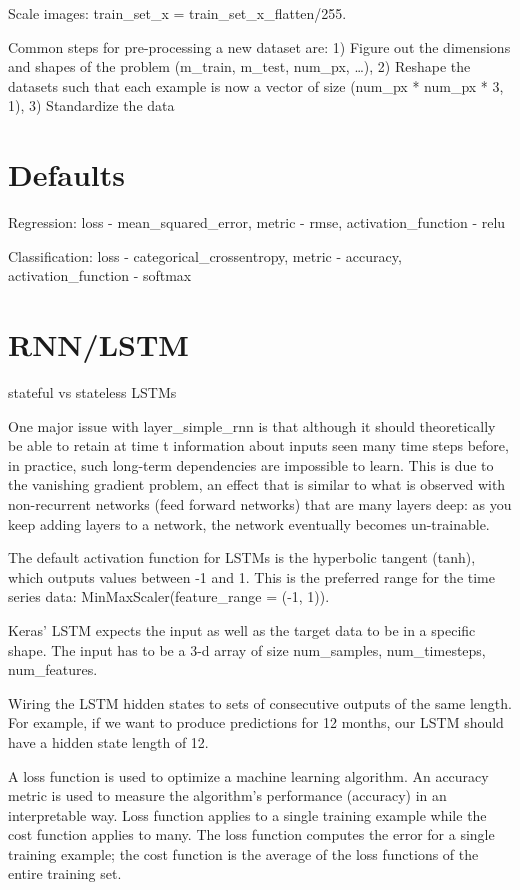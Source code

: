 \documentclass[]{book}
\begin{document}
Scale images: train\_set\_x = train\_set\_x\_flatten/255.

Common steps for pre-processing a new dataset are: 1) Figure out the
dimensions and shapes of the problem (m\_train, m\_test, num\_px,
\ldots{}), 2) Reshape the datasets such that each example is now a
vector of size (num\_px * num\_px * 3, 1), 3) Standardize the data

\section{Defaults}\label{defaults}

Regression: loss - mean\_squared\_error, metric - rmse,
activation\_function - relu

Classification: loss - categorical\_crossentropy, metric - accuracy,
activation\_function - softmax

\section{RNN/LSTM}\label{rnnlstm}

stateful vs stateless LSTMs

One major issue with layer\_simple\_rnn is that although it should
theoretically be able to retain at time t information about inputs seen
many time steps before, in practice, such long-term dependencies are
impossible to learn. This is due to the vanishing gradient problem, an
effect that is similar to what is observed with non-recurrent networks
(feed forward networks) that are many layers deep: as you keep adding
layers to a network, the network eventually becomes un-trainable.

The default activation function for LSTMs is the hyperbolic tangent
(tanh), which outputs values between -1 and 1. This is the preferred
range for the time series data: MinMaxScaler(feature\_range = (-1, 1)).

Keras' LSTM expects the input as well as the target data to be in a
specific shape. The input has to be a 3-d array of size num\_samples,
num\_timesteps, num\_features.

Wiring the LSTM hidden states to sets of consecutive outputs of the same
length. For example, if we want to produce predictions for 12 months,
our LSTM should have a hidden state length of 12.

A loss function is used to optimize a machine learning algorithm. An
accuracy metric is used to measure the algorithm's performance
(accuracy) in an interpretable way. Loss function applies to a single
training example while the cost function applies to many. The loss
function computes the error for a single training example; the cost
function is the average of the loss functions of the entire training
set.
\end{document}
